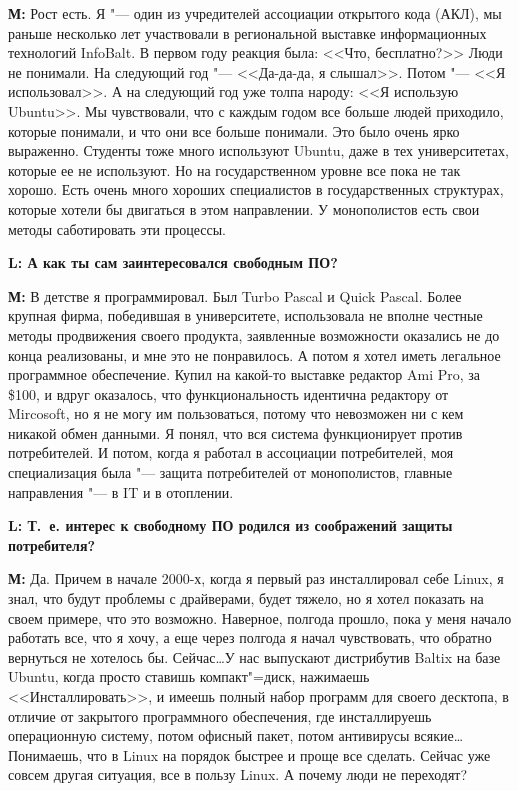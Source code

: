 \documentclass[10pt, a5paper]{article}
\begin{document}
{\noindent \bf М:} Рост есть. Я "--- один из учредителей ассоциации открытого кода (АКЛ), мы раньше несколько лет участвовали в региональной выставке информационных технологий InfoBalt. В первом году реакция была: <<Что, бесплатно?>> Люди не понимали. На следующий год "--- <<Да-да-да, я слышал>>. Потом "--- <<Я использовал>>. А на следующий год уже толпа народу: <<Я использую Ubuntu>>. Мы чувствовали, что с каждым годом все больше людей приходило, которые понимали, и что они все больше понимали. Это было очень ярко выраженно. Студенты тоже много используют Ubuntu, даже в тех университетах, которые ее не используют. Но на государственном уровне все пока не так хорошо. Есть очень много хороших специалистов в государственных структурах, которые хотели бы двигаться в этом направлении. У монополистов есть свои методы саботировать эти процессы.

{\noindent \bf L: А как ты сам заинтересовался свободным ПО?}

{\noindent \bf М:} В детстве я программировал. Был Turbo Pascal и  Quick Pascal. Более крупная фирма, победившая в университете, использовала не вполне честные методы продвижения своего продукта, заявленные возможности оказались не до конца реализованы, и мне это не понравилось. А потом я хотел иметь легальное программное обеспечение. Купил на какой-то выставке редактор Ami Pro, за \$100, и вдруг оказалось, что функциональность идентична редактору от Mircosoft, но я не могу им пользоваться, потому что невозможен ни с кем никакой обмен данными. Я понял, что вся система функционирует против потребителей. И потом, когда я работал в ассоциации потребителей, моя специализация была "--- защита потребителей от монополистов, главные направления "--- в IT  и в отоплении.

{\noindent \bf L: Т.~е. интерес к свободному ПО родился из соображений защиты потребителя?}

{\noindent \bf М:} Да. Причем в начале 2000-х, когда я первый раз инсталлировал себе Linux, я знал, что будут проблемы с драйверами, будет тяжело, но я хотел показать на своем примере, что это возможно. Наверное, полгода прошло, пока у меня начало работать все, что я хочу, а еще через полгода я начал чувствовать, что  обратно вернуться не хотелось бы. Сейчас\ldots У нас выпускают дистрибутив Baltix на базе Ubuntu, когда просто ставишь компакт"=диск, нажимаешь <<Инсталлировать>>, и имеешь полный набор программ для своего десктопа, в отличие от закрытого программного обеспечения, где инсталлируешь операционную систему, потом офисный пакет, потом антивирусы всякие\ldots Понимаешь, что в Linux  на порядок быстрее и проще все сделать. Сейчас уже совсем другая ситуация, все в пользу Linux. А почему люди не переходят?
\end{document}
